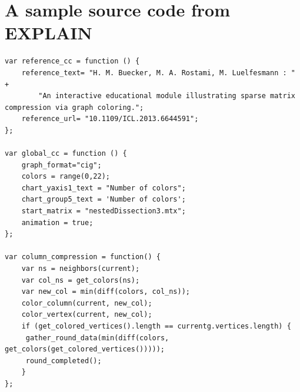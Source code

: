 \documentclass[11pt, twoside,a4paper]{book}
\begin{document}
\chapter{A sample source code from EXPLAIN}
\label{app.source}
\begin{lstlisting}
var reference_cc = function () {
    reference_text= "H. M. Buecker, M. A. Rostami, M. Luelfesmann : " +
        "An interactive educational module illustrating sparse matrix compression via graph coloring.";
    reference_url= "10.1109/ICL.2013.6644591";
};

var global_cc = function () {
    graph_format="cig";
    colors = range(0,22);
    chart_yaxis1_text = "Number of colors";
    chart_group5_text = 'Number of colors';
    start_matrix = "nestedDissection3.mtx";
    animation = true;
};

var column_compression = function() {
    var ns = neighbors(current);
    var col_ns = get_colors(ns);
    var new_col = min(diff(colors, col_ns));
    color_column(current, new_col);
    color_vertex(current, new_col);
    if (get_colored_vertices().length == currentg.vertices.length) {
     gather_round_data(min(diff(colors, get_colors(get_colored_vertices()))));
     round_completed();
    }
};
\end{lstlisting}
\end{document}
